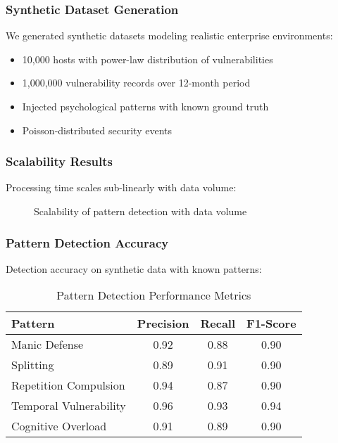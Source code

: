\documentclass[11pt,a4paper]{article}
\begin{document}
\subsubsection{Synthetic Dataset Generation}

We generated synthetic datasets modeling realistic enterprise environments:

\begin{itemize}
\item 10,000 hosts with power-law distribution of vulnerabilities
\item 1,000,000 vulnerability records over 12-month period
\item Injected psychological patterns with known ground truth
\item Poisson-distributed security events
\end{itemize}

\subsubsection{Scalability Results}

Processing time scales sub-linearly with data volume:

\begin{figure}[h!]
\centering
{}
\caption{Scalability of pattern detection with data volume}
\label{fig:scalability}
\end{figure}

\subsubsection{Pattern Detection Accuracy}

Detection accuracy on synthetic data with known patterns:

\begin{table}[h!]
\centering
\caption{Pattern Detection Performance Metrics}
\label{tab:accuracy}
\begin{tabular}{lccc}
\toprule
Pattern & Precision & Recall & F1-Score \\
\midrule
Manic Defense & 0.92 & 0.88 & 0.90 \\
Splitting & 0.89 & 0.91 & 0.90 \\
Repetition Compulsion & 0.94 & 0.87 & 0.90 \\
Temporal Vulnerability & 0.96 & 0.93 & 0.94 \\
Cognitive Overload & 0.91 & 0.89 & 0.90 \\
\bottomrule
\end{tabular}
\end{table}
\end{document}
